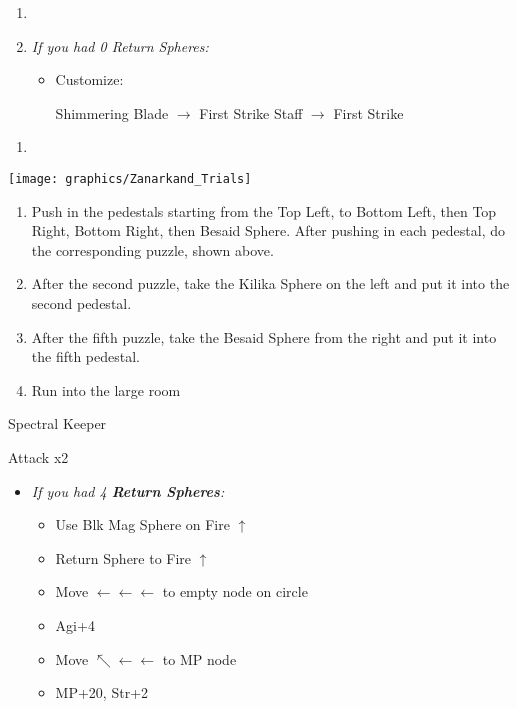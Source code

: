 \begin{enumerate}[resume]
    \item \formation{\tidus}{\auron}{\yuna}
    \bothcb
    \item \textit{If you had 0 Return Spheres:}
    \begin{itemize}
        \item Customize:
        \begin{itemize}
            \auronf Shimmering Blade $\rightarrow$ First Strike
            \yunaf Staff $\rightarrow$ First Strike
        \end{itemize}
    \end{itemize}
\end{enumerate}
\begin{enumerate}[resume]
    \item {\large \save}
\end{enumerate}
\texttt{[image: graphics/Zanarkand\_Trials]}
\begin{enumerate}[resume]
    \item Push in the pedestals starting from the Top Left, to Bottom Left, then Top Right, Bottom Right, then Besaid Sphere. After pushing in each pedestal, do the corresponding puzzle, shown above.
    \item After the second puzzle, take the Kilika Sphere on the left and put it into the second pedestal.
    \item After the fifth puzzle, take the Besaid Sphere from the right and put it into the fifth pedestal.
    \item Run into the large room
\end{enumerate}
\begin{battle}[52000]{Spectral Keeper}
    \begin{itemize}
        \summon{\bahamut}
        \bahamutf Attack x2
    \end{itemize}
\end{battle}
\begin{spheregrid}
    \begin{itemize}
        \yunaf
        \begin{itemize}
            \item \textit{If you had 4 \textbf{Return Spheres}:}
            \begin{itemize}
                \item Use Blk Mag Sphere on Fire $\uparrow$
                \item Return Sphere to Fire $\uparrow$
                \item Move $\leftarrow\leftarrow\leftarrow$ to empty node on circle
                \item Agi+4
                \item Move $\nwarrow\leftarrow\leftarrow$ to MP node
                \item MP+20, Str+2
            \end{itemize}
        \end{itemize}
    \end{itemize}
\end{spheregrid}
